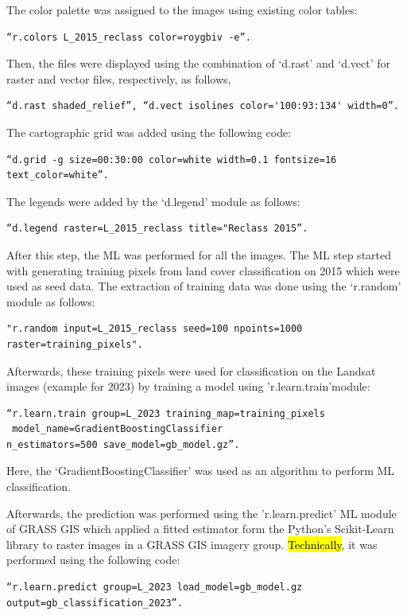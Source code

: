 \documentclass[jimaging,article,submit,pdftex,moreauthors]{Definitions/mdpi}
\begin{document}
The color palette was assigned to the images using existing color tables: 
 \begin{verbatim}
“r.colors L_2015_reclass color=roygbiv -e”. 
\end{verbatim}
Then, the files were displayed using the combination of ‘d.rast’ and ‘d.vect’ for raster and vector files, respectively, as follows, 
 \begin{verbatim}
“d.rast shaded_relief”, “d.vect isolines color='100:93:134' width=0”. 
\end{verbatim}

The cartographic grid was added using the following code:  
\begin{verbatim}
“d.grid -g size=00:30:00 color=white width=0.1 fontsize=16 text_color=white”. 
\end{verbatim}
The legends were added by the ‘d.legend’ module as follows:

 \begin{verbatim}
“d.legend raster=L_2015_reclass title="Reclass 2015”. 
\end{verbatim}

After this step, the ML was performed for all the images. The ML step started with generating training pixels from land cover classification on 2015 which were used as seed data. The extraction of training data was done using the ‘r.random’ module as follows: 
 \begin{verbatim}
"r.random input=L_2015_reclass seed=100 npoints=1000 raster=training_pixels". 
\end{verbatim}
Afterwards, these training pixels were used for classification on the Landsat images (example for 2023) by training a model using 'r.learn.train'module: 
 \begin{verbatim}
“r.learn.train group=L_2023 training_map=training_pixels
 model_name=GradientBoostingClassifier 
n_estimators=500 save_model=gb_model.gz”. 
\end{verbatim}
Here, the ‘GradientBoostingClassifier’ was used as an algorithm to perform ML classification. 

Afterwards, the prediction was performed using the 'r.learn.predict' ML module of GRASS GIS which applied a fitted estimator form the Python's Scikit-Learn library \cite{pedregosa2018} to raster images in a GRASS GIS imagery group. \hl{Technically}, it was performed using the following code: 
 \begin{verbatim}
“r.learn.predict group=L_2023 load_model=gb_model.gz 
output=gb_classification_2023”. 
\end{verbatim}
\end{document}
